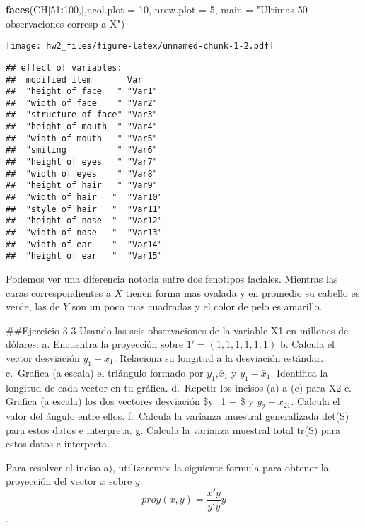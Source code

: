 \documentclass[]{article}
\newenvironment{Shaded}{\begin{snugshade}}{\end{snugshade}}
\newcommand{\DataTypeTok}[1]{\textcolor[rgb]{0.13,0.29,0.53}{#1}}
\newcommand{\DecValTok}[1]{\textcolor[rgb]{0.00,0.00,0.81}{#1}}
\newcommand{\KeywordTok}[1]{\textcolor[rgb]{0.13,0.29,0.53}{\textbf{#1}}}
\newcommand{\NormalTok}[1]{#1}
\newcommand{\OperatorTok}[1]{\textcolor[rgb]{0.81,0.36,0.00}{\textbf{#1}}}
\newcommand{\StringTok}[1]{\textcolor[rgb]{0.31,0.60,0.02}{#1}}
\begin{document}
\begin{Shaded}
\begin{Highlighting}[]
\KeywordTok{faces}\NormalTok{(CH[}\DecValTok{51}\OperatorTok{:}\DecValTok{100}\NormalTok{,],}\DataTypeTok{ncol.plot =} \DecValTok{10}\NormalTok{, }\DataTypeTok{nrow.plot =} \DecValTok{5}\NormalTok{, }\DataTypeTok{main =} \StringTok{"Ultimas 50 observaciones corresp a X"}\NormalTok{)}
\end{Highlighting}
\end{Shaded}

\texttt{[image: hw2\_files/figure-latex/unnamed-chunk-1-2.pdf]}

\begin{verbatim}
## effect of variables:
##  modified item       Var    
##  "height of face   " "Var1" 
##  "width of face    " "Var2" 
##  "structure of face" "Var3" 
##  "height of mouth  " "Var4" 
##  "width of mouth   " "Var5" 
##  "smiling          " "Var6" 
##  "height of eyes   " "Var7" 
##  "width of eyes    " "Var8" 
##  "height of hair   " "Var9" 
##  "width of hair   "  "Var10"
##  "style of hair   "  "Var11"
##  "height of nose  "  "Var12"
##  "width of nose   "  "Var13"
##  "width of ear    "  "Var14"
##  "height of ear   "  "Var15"
\end{verbatim}

Podemos ver una diferencia notoria entre dos fenotipos faciales.
Mientras las caras correspondientes a \(X\) tienen forma mas ovalada y
en promedio su cabello es verde, las de \(Y\) son un poco mas cuadradas
y el color de pelo es amarillo.

\#\#Ejercicio 3 3 Usando las seis observaciones de la variable X1 en
millones de dólares: a. Encuentra la proyección sobre
\(1'= (1, 1, 1, 1, 1, 1)\) b. Calcula el vector desviación
\(y_1 − \bar{x}_1\). Relaciona su longitud a la desviación estándar.
c.~Grafica (a escala) el triángulo formado por \(y_1\),\(\bar{x}_1\) y
\(y_1 − \bar{x}_1\). Identifica la longitud de cada vector en tu
gráfica. d.~Repetir los incisos (a) a (c) para X2 e. Grafica (a escala)
los dos vectores desviación \$y\_1 − \$ y \(y_2 − \bar{x}_21\). Calcula
el valor del ángulo entre ellos. f.~Calcula la varianza muestral
generalizada det(S) para estos datos e interpreta. g. Calcula la
varianza muestral total tr(S) para estos datos e interpreta.

Para resolver el inciso a), utilizaremos la siguiente formula para
obtener la proyección del vector \(x\) sobre \(y\).
\[proy(x,y)= \frac{x'y}{y'y}y \].
\end{document}
